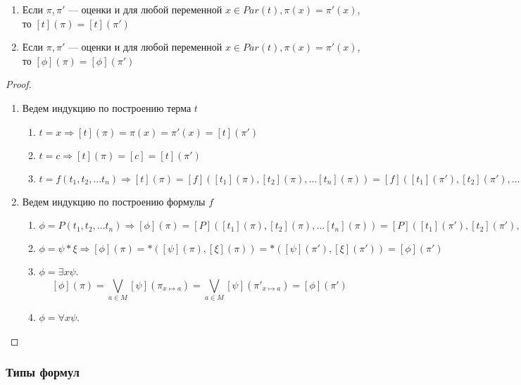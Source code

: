 \begin{theorem}\indent
    \begin{enumerate}
        \item Если $\pi, \pi'$ --- оценки и для любой переменной $x \in Par(t), \pi(x) = \pi'(x)$, то $[t](\pi) = [t](\pi')$
        \item Если $\pi, \pi'$ --- оценки и для любой переменной $x \in Par(t), \pi(x) = \pi'(x)$, то $[\phi](\pi) = [\phi](\pi')$
    \end{enumerate}
\end{theorem}
\begin{proof}\indent
    \begin{enumerate}
        \item Ведем индукцию по построению терма $t$
        \begin{enumerate}
            \item $t = x \Rightarrow [t](\pi) = \pi(x) = \pi'(x) = [t](\pi')$
            \item $t = c \Rightarrow [t](\pi) = [c] = [t](\pi')$
            \item $t = f(t_1, t_2, \dots t_n) \Rightarrow [t](\pi) = [f]([t_1](\pi), [t_2](\pi), \dots [t_n](\pi)) = [f]([t_1](\pi'), [t_2](\pi'), \dots [t_n](\pi'))$
        \end{enumerate}   
        \item Ведем индукцию по построению формулы $f$
        \begin{enumerate}
            \item $\phi = P(t_1, t_2, \dots t_n) \Rightarrow [\phi](\pi) = [P]([t_1](\pi), [t_2](\pi), \dots [t_n](\pi)) = [P]([t_1](\pi'), [t_2](\pi'), \dots [t_n](\pi'))$
            \item $\phi = \psi * \xi \Rightarrow [\phi](\pi) = *([\psi](\pi), [\xi](\pi)) = *([\psi](\pi'), [\xi](\pi')) = [\phi](\pi')$
            \item $\phi = \exists x \psi$.
            $$[\phi](\pi) = \bigvee_{a \in M}[\psi](\pi_{x \mapsto a}) = \bigvee_{a \in M}[\psi](\pi'_{x \mapsto a}) = [\phi](\pi')$$
            \item $\phi = \forall x \psi$.
        \end{enumerate}   
    \end{enumerate}
\end{proof}

\subsubsection{Типы формул}

